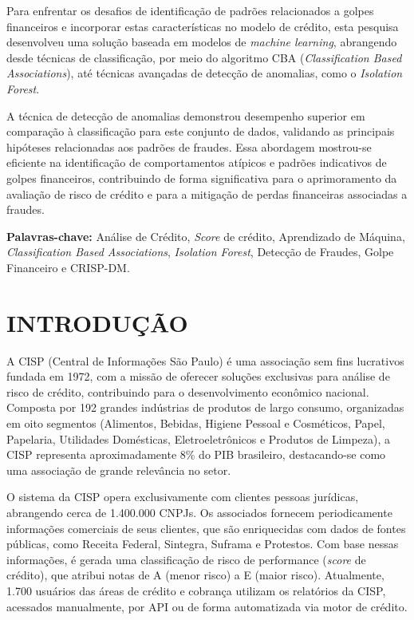 \documentclass[12pt,a4paper]{article}
\begin{document}
Para enfrentar os desafios de identificação de padrões relacionados a golpes financeiros e incorporar estas características no modelo de crédito, esta pesquisa desenvolveu uma solução baseada em modelos de \textit{machine learning}, abrangendo desde técnicas de classificação, por meio do algoritmo CBA (\textit{Classification Based Associations}), até técnicas avançadas de detecção de anomalias, como o \textit{Isolation Forest}. 

A técnica de detecção de anomalias demonstrou desempenho superior em comparação à classificação para este conjunto de dados, validando as principais hipóteses relacionadas aos padrões de fraudes. Essa abordagem mostrou-se eficiente na identificação de comportamentos atípicos e padrões indicativos de golpes financeiros, contribuindo de forma significativa para o aprimoramento da avaliação de risco de crédito e para a mitigação de perdas financeiras associadas a fraudes.
\\[0.5cm]
\begin{flushleft}
{\bf Palavras-chave:} {Análise de Crédito, \textit{Score} de crédito, Aprendizado de Máquina, \textit{Classification Based Associations}, \textit{Isolation Forest}, Detecção de Fraudes, Golpe Financeiro e CRISP-DM.}
\end{flushleft}

\newpage
\thispagestyle{empty}
\tableofcontents

\newpage
\pagestyle{plain}
\renewcommand{\baselinestretch}{1.5}
\normalsize
\section{INTRODUÇÃO}
A CISP (Central de Informações São Paulo) é uma associação sem fins lucrativos fundada em 1972, com a missão de oferecer soluções exclusivas para análise de risco de crédito, contribuindo para o desenvolvimento econômico nacional. Composta por 192 grandes indústrias de produtos de largo consumo, organizadas em oito segmentos (Alimentos, Bebidas, Higiene Pessoal e Cosméticos, Papel, Papelaria, Utilidades Domésticas, Eletroeletrônicos e Produtos de Limpeza), a CISP representa aproximadamente 8\% do PIB brasileiro, destacando-se como uma associação de grande relevância no setor.

O sistema da CISP opera exclusivamente com clientes pessoas jurídicas, abrangendo cerca de 1.400.000 CNPJs. Os associados fornecem periodicamente informações comerciais de seus clientes, que são enriquecidas com dados de fontes públicas, como Receita Federal, Sintegra, Suframa e Protestos. Com base nessas informações, é gerada uma classificação de risco de performance (\textit{score} de crédito), que atribui notas de A (menor risco) a E (maior risco). Atualmente, 1.700 usuários das áreas de crédito e cobrança utilizam os relatórios da CISP, acessados manualmente, por API ou de forma automatizada via motor de crédito.
\end{document}
